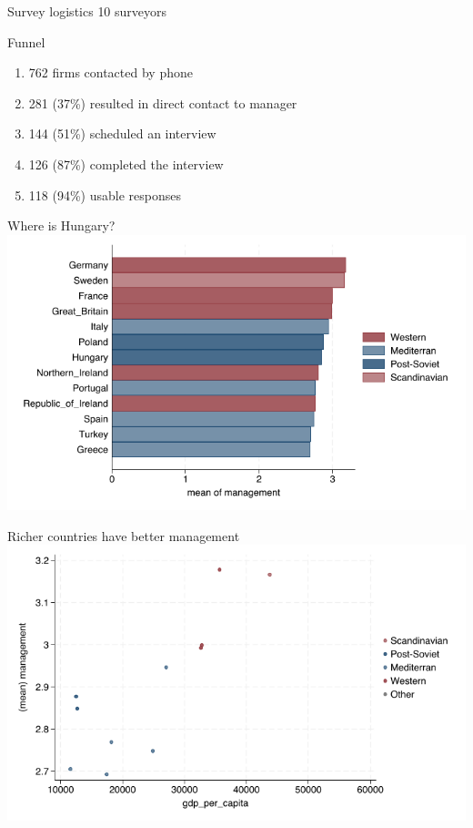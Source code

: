 \documentclass[
  ignorenonframetext,
  aspectratio=1610,
]{beamer}
\providecommand{\tightlist}{%
  \setlength{\itemsep}{0pt}\setlength{\parskip}{0pt}}
\begin{document}
\begin{frame}{Survey logistics}
\protect\hypertarget{survey-logistics}{}
10 surveyors

\begin{block}{Funnel}
\protect\hypertarget{funnel}{}
\begin{enumerate}
\tightlist
\item
  762 firms contacted by phone
\item
  281 (37\%) resulted in direct contact to manager
\item
  144 (51\%) scheduled an interview
\item
  126 (87\%) completed the interview
\item
  118 (94\%) usable responses
\end{enumerate}
\end{block}
\end{frame}

\begin{frame}{Where is Hungary?}
\protect\hypertarget{where-is-hungary}{}
\includegraphics{fig/management-means.png}
\end{frame}

\begin{frame}{Richer countries have better management}
\protect\hypertarget{richer-countries-have-better-management}{}
\includegraphics{fig/management-vs-gdp.png}
\end{frame}
\end{document}
